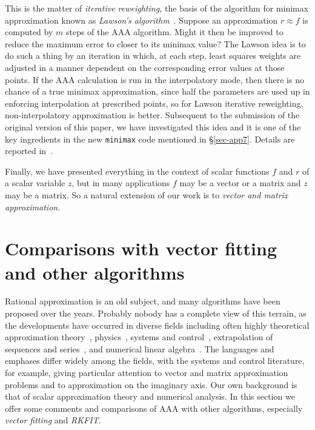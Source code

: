 \documentclass[final]{siamltex}
\begin{document}
This is the matter of {\em iterative reweighting,} the basis of
the algorithm for minimax approximation known as {\em Lawson's
algorithm}~\cite{ew,lawson}.  Suppose an approximation $r\approx
f$ is computed by $m$ steps of the AAA algorithm.  Might it then
be improved to reduce the maximum error to closer to its minimax
value?  The Lawson idea is to do such a thing by an iteration
in which, at each step, least squares weights are adjusted in a
manner dependent on the corresponding error values at those points.
If the AAA calculation is run in the interpolatory mode, then
there is no chance of a true minimax approximation, since half the
parameters are used up in enforcing interpolation at prescribed
points, so for Lawson iterative reweighting, non-interpolatory
approximation is better.  Subsequent to the submission of the
original version of this paper, we have investigated this idea
and it is one of the key ingredients in the new {\tt minimax}
code mentioned in \S\ref{sec-app7}.  Details are reported in~\cite{fntb}.

Finally,
we have presented everything in the context of scalar functions
$f$ and $r$ of a scalar variable $z$, but in many applications $f$ may
be a vector or a matrix and $z$ may be a matrix.
So a natural extension of our work
is to {\em vector and matrix approximation.}

\section{\label{comparisons}Comparisons with
vector fitting and other algorithms}

Rational approximation is an old subject, and many algorithms have
been proposed over the years.  Probably nobody has a complete view of this
terrain, as the developments have occurred in diverse fields including
often highly theoretical approximation theory~\cite{aptek1,aptek,braess,
gaier,levinsaff,newman,pomm,sl,stahlabs,stahl,stahlspurious,vrc,walsh},
physics~\cite{bgm,froissart,gk03,gp97,gp99},
systems and control~\cite{antoulas,aa,belevitch,chdo,dmdd,dgb,
gab,gust,gs,ionita,dsp,sk},
extrapolation of sequences and series~\cite{bz,bz13,bz15},
and numerical linear algebra~\cite{bg1,gk,in}.
The languages and emphases differ widely among the fields, with the systems
and control literature, for example, giving particular attention to vector
and matrix approximation problems and to approximation on the imaginary axis.
Our own background is that of scalar approximation theory and
numerical analysis.  In this section we
offer some comments and comparisons of AAA with other algorithms,
especially {\em vector fitting} and {\em RKFIT}.
\end{document}
